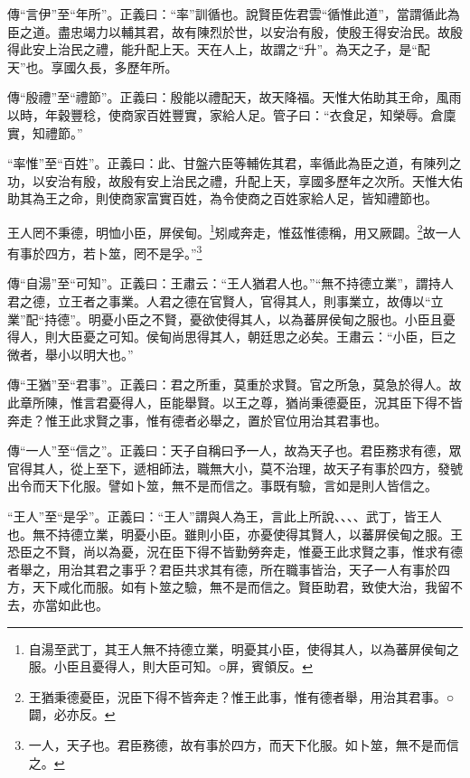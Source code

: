 {\noindent\zhuan{}\fzbyks 傳“言伊”至“年所”。正義曰：“率”訓循也。說賢臣佐君雲“循惟此道”，當謂循此為臣之道。盡忠竭力以輔其君，故有陳烈於世，以安治有殷，使殷王得安治民。故殷得此安上治民之禮，能升配上天。天在人上，故謂之“升”。為天之子，是“配天”也。享國久長，多歷年所。 \par}

{\noindent\zhuan{}\fzbyks 傳“殷禮”至“禮節”。正義曰：殷能以禮配天，故天降福。天惟大佑助其王命，風雨以時，年穀豐稔，使商家百姓豐實，家給人足。管子曰：“衣食足，知榮辱。倉廩實，知禮節。” \par}

{\noindent\shu{}\fzkt “率惟”至“百姓”。正義曰：此、甘盤六臣等輔佐其君，率循此為臣之道，有陳列之功，以安治有殷，故殷有安上治民之禮，升配上天，享國多歷年之次所。天惟大佑助其為王之命，則使商家富實百姓，為令使商之百姓家給人足，皆知禮節也。 \par}

王人罔不秉德，明恤小臣，屏侯甸。\footnote{自湯至武丁，其王人無不持德立業，明憂其小臣，使得其人，以為蕃屏侯甸之服。小臣且憂得人，則大臣可知。○屏，賓領反。}矧咸奔走，惟茲惟德稱，用又厥闢。\footnote{王猶秉德憂臣，況臣下得不皆奔走？惟王此事，惟有德者舉，用治其君事。○闢，必亦反。}故一人有事於四方，若卜筮，罔不是孚。”\footnote{一人，天子也。君臣務德，故有事於四方，而天下化服。如卜筮，無不是而信之。}


{\noindent\zhuan{}\fzbyks 傳“自湯”至“可知”。正義曰：王肅云：“王人猶君人也。”“無不持德立業”，謂持人君之德，立王者之事業。人君之德在官賢人，官得其人，則事業立，故傳以“立業”配“持德”。明憂小臣之不賢，憂欲使得其人，以為蕃屏侯甸之服也。小臣且憂得人，則大臣憂之可知。侯甸尚思得其人，朝廷思之必矣。王肅云：“小臣，巨之微者，舉小以明大也。” \par}

{\noindent\zhuan{}\fzbyks 傳“王猶”至“君事”。正義曰：君之所重，莫重於求賢。官之所急，莫急於得人。故此章所陳，惟言君憂得人，臣能舉賢。以王之尊，猶尚秉德憂臣，況其臣下得不皆奔走？惟王此求賢之事，惟有德者必舉之，置於官位用治其君事也。 \par}

{\noindent\zhuan{}\fzbyks 傳“一人”至“信之”。正義曰：天子自稱曰予一人，故為天子也。君臣務求有德，眾官得其人，從上至下，遞相師法，職無大小，莫不治理，故天子有事於四方，發號出令而天下化服。譬如卜筮，無不是而信之。事既有驗，言如是則人皆信之。 \par}

{\noindent\shu{}\fzkt “王人”至“是孚”。正義曰：“王人”謂與人為王，言此上所說、、、、武丁，皆王人也。無不持德立業，明憂小臣。雖則小臣，亦憂使得其賢人，以蕃屏侯甸之服。王恐臣之不賢，尚以為憂，況在臣下得不皆勤勞奔走，惟憂王此求賢之事，惟求有德者舉之，用治其君之事乎？君臣共求其有德，所在職事皆治，天子一人有事於四方，天下咸化而服。如有卜筮之驗，無不是而信之。賢臣助君，致使大治，我留不去，亦當如此也。 \par}

